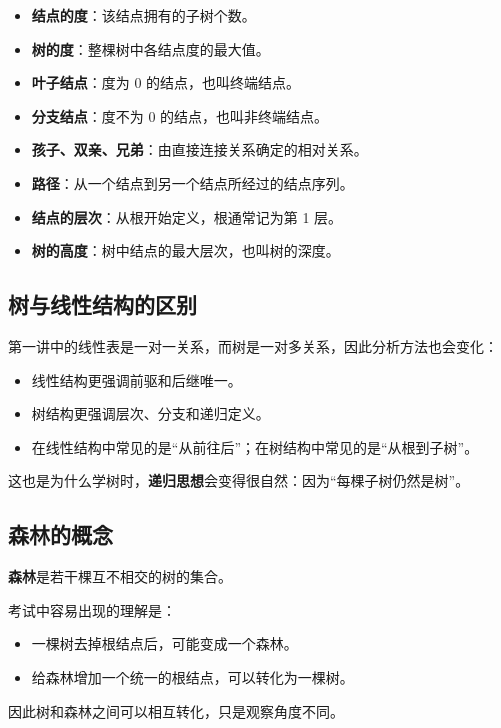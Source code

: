 \documentclass{../../note}
\begin{document}
\begin{itemize}
  \item \textbf{结点的度}：该结点拥有的子树个数。
  \item \textbf{树的度}：整棵树中各结点度的最大值。
  \item \textbf{叶子结点}：度为 0 的结点，也叫终端结点。
  \item \textbf{分支结点}：度不为 0 的结点，也叫非终端结点。
  \item \textbf{孩子、双亲、兄弟}：由直接连接关系确定的相对关系。
  \item \textbf{路径}：从一个结点到另一个结点所经过的结点序列。
  \item \textbf{结点的层次}：从根开始定义，根通常记为第 1 层。
  \item \textbf{树的高度}：树中结点的最大层次，也叫树的深度。
\end{itemize}

\subsection{树与线性结构的区别}

第一讲中的线性表是一对一关系，而树是一对多关系，因此分析方法也会变化：

\begin{itemize}
  \item 线性结构更强调前驱和后继唯一。
  \item 树结构更强调层次、分支和递归定义。
  \item 在线性结构中常见的是“从前往后”；在树结构中常见的是“从根到子树”。
\end{itemize}

这也是为什么学树时，\textbf{递归思想}会变得很自然：因为“每棵子树仍然是树”。

\subsection{森林的概念}

\textbf{森林}是若干棵互不相交的树的集合。

考试中容易出现的理解是：

\begin{itemize}
  \item 一棵树去掉根结点后，可能变成一个森林。
  \item 给森林增加一个统一的根结点，可以转化为一棵树。
\end{itemize}

因此树和森林之间可以相互转化，只是观察角度不同。
\end{document}
